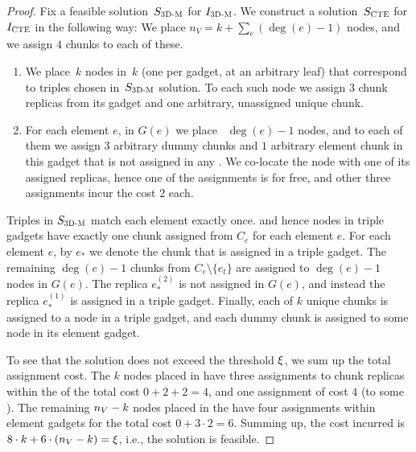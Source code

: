 \begin{proof}
  Fix a feasible solution~$S_{\mathrm{\textsc{3D-M}}}$ for $I_{\mathrm{\textsc{3D-M}}}$. We construct a solution~$S_{\mathrm{\textsc{CTE}}}$ for $I_{\mathrm{\textsc{CTE}}}$ in the following way:
  We place $n_V = k + \sum_e(\deg(e) - 1)$ nodes, and we assign $4$ chunks to each of these.
  \begin{enumerate}
    \item We place~$k$ nodes in~$k$ {\TripleGadgets} (one per gadget, at an arbitrary leaf) that correspond to triples chosen in~$S_{\mathrm{\textsc{3D-M}}}$ solution.
    To each such node we assign $3$ chunk replicas from its gadget and one arbitrary, unassigned unique chunk.
    \item For each element $e$, in $G(e)$ we place
    ~$\deg(e) - 1$ nodes, and to each of them we assign $3$ arbitrary dummy chunks and $1$ arbitrary 
    element chunk in this
    gadget that is not assigned in any {\TripleGadget}.
    We co-locate the node with one of its assigned replicas, hence one of the assignments is for free, and other three assignments incur the cost $2$ each.
  \end{enumerate}
  Triples in $S_{\mathrm{\textsc{3D-M}}}$ match each element exactly once.
  and hence nodes in triple gadgets have exactly one chunk assigned from $C_e$ for each element $e$.
  For each element $e$, by $e_*$ we denote the chunk that is assigned in a triple gadget.
  The remaining $\deg(e)-1$ chunks from $C_e \setminus \{ e_t \}$ are assigned to $\deg(e)-1$ nodes in $G(e)$.
  The replica $e_*^{(2)}$  is not assigned in $G(e)$, and instead the replica $e_*^{(1)}$ is assigned in a triple gadget.
  Finally, each of $k$ unique chunks is assigned to a node in a triple gadget, and each dummy chunk is assigned to some node in its element gadget.
  
  To see that the solution does not exceed the threshold $\xi$, we sum up the total assignment cost.
  The $k$ nodes placed in \TripleGadgets{} have three assignments to chunk replicas within the \TripleGadget{} of the total cost $0+2+2=4$, and one assignment of cost $4$ (to some \UnqGadget{}).
  The remaining $n_V-k$ nodes placed in the \CoverSubtree{} have four assignments within element gadgets for the total cost $0+3\cdot 2 = 6$.
  Summing up, the cost incurred is $8\cdot k + 6\cdot (n_V - k) = \xi$, i.e., the solution is feasible.
\end{proof}

